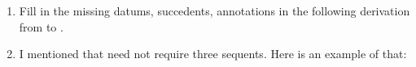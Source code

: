 \begin{enumerate}
\begin{argument*}












\end{argument*}


\item Fill in the missing datums, succedents, annotations in the following  
 derivation from  to .
 
\begin{argument*}













\end{argument*}

\item I mentioned that \disjE{} need not require three sequents. Here is an 
 example of that:


\end{enumerate}
